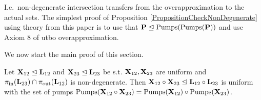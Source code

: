 I.e.\ non-degenerate intersection transfers from the overapproximation to the actual sets. The simplest proof of Proposition \ref{PropositionCheckNonDegenerate} using theory from this paper is to use that \(\mathbf{P} \trianglelefteq \operatorname{Pumps}(\operatorname{Pumps}(\mathbf{P}))\) and use Axiom 8 of utbo overapproximation. 

We now start the main proof of this section.

\begin{lemma}
Let \(\mathbf{X}_{12}\trianglelefteq \mathbf{L}_{12}\) and \(\mathbf{X}_{23}\trianglelefteq \mathbf{L}_{23}\) be s.t. \(\mathbf{X}_{12}, \mathbf{X}_{23}\) are uniform and \(\pi_{\text{in}}(\mathbf{L}_{23}) \cap \pi_{\text{out}}(\mathbf{L}_{12})\) is non-degenerate. Then \(\mathbf{X}_{12} \circ \mathbf{X}_{23} \trianglelefteq \mathbf{L}_{12} \circ \mathbf{L}_{23}\) is uniform with the set of pumps \(\operatorname{Pumps}(\mathbf{X}_{12} \circ \mathbf{X}_{23})=\operatorname{Pumps}(\mathbf{X}_{12}) \circ \operatorname{Pumps}(\mathbf{X}_{23})\).
\end{lemma}

